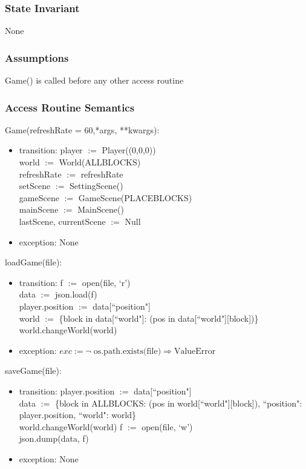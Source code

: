 \documentclass{article}
\begin{document}
\subsubsection {State Invariant}
None

\subsubsection {Assumptions}
Game() is called before any other access routine

\subsubsection {Access Routine Semantics}
\noindent Game(refreshRate = 60,*args, **kwargs):
\begin{itemize}
\item transition: player $:=$ Player((0,0,0))\\
    world $:=$ World(ALLBLOCKS)\\
    refreshRate $:=$ refreshRate\\
    setScene $:=$ SettingScene()\\
    gameScene $:=$ GameScene(PLACEBLOCKS)\\
    mainScene $:=$ MainScene()\\
    lastScene, currentScene $:=$ Null
\item exception: None
\end{itemize}\vspace{6mm}

\noindent loadGame(file):
\begin{itemize}
\item transition: f $:=$ open(file, `r')\\
    data $:=$ json.load(f)\\
    player.position $:=$ data[``position"]\\
    world $:=$ \{block in data[``world"]: (pos in data[``world"][block])\}\\
    world.changeWorld(world)
\item exception: $exc := \neg \; \text{os.path.exists(file)} \Rightarrow \text{ValueError}$
\end{itemize}\vspace{6mm}

\noindent saveGame(file):
\begin{itemize}
\item transition: player.position $:=$ data[``position"]\\
    data $:=$ \{block in ALLBLOCKS: (pos in world[``world"][block]), ``position": player.position, ``world": world\}\\
    world.changeWorld(world)
    f $:=$ open(file, `w')\\
    json.dump(data, f)
\item exception: None
\end{itemize}\vspace{6mm}
\end{document}
